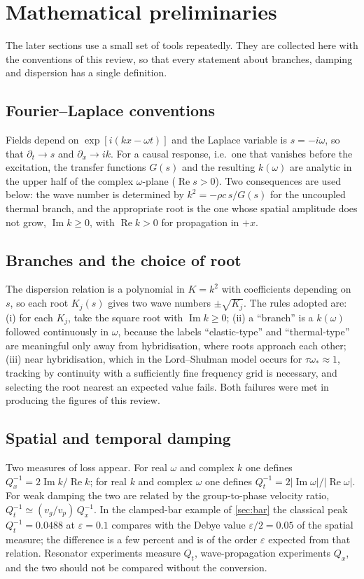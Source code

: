 \section{Mathematical preliminaries}\label{sec:prelim}

The later sections use a small set of tools repeatedly. They are collected here with the conventions of this review, so that every statement about branches, damping and dispersion has a single definition.

\subsection{Fourier--Laplace conventions}
Fields depend on $\exp[i(kx-\omega t)]$ and the Laplace variable is $s=-i\omega$, so that $\partial_t\to s$ and $\partial_x\to ik$. For a causal response, i.e.\ one that vanishes before the excitation, the transfer functions $G(s)$ and the resulting $k(\omega)$ are analytic in the upper half of the complex $\omega$-plane ($\operatorname{Re}s>0$). Two consequences are used below: the wave number is determined by $k^2=-\rho c\,s/G(s)$ for the uncoupled thermal branch, and the appropriate root is the one whose spatial amplitude does not grow, $\operatorname{Im}k\ge0$, with $\operatorname{Re}k>0$ for propagation in $+x$.

\subsection{Branches and the choice of root}
The dispersion relation is a polynomial in $K=k^2$ with coefficients depending on $s$, so each root $K_j(s)$ gives two wave numbers $\pm\sqrt{K_j}$. The rules adopted are: (i) for each $K_j$, take the square root with $\operatorname{Im}k\ge0$; (ii) a ``branch'' is a $k(\omega)$ followed continuously in $\omega$, because the labels ``elastic-type'' and ``thermal-type'' are meaningful only away from hybridisation, where roots approach each other; (iii) near hybridisation, which in the Lord--Shulman model occurs for $\tau\omega_*\approx1$, tracking by continuity with a sufficiently fine frequency grid is necessary, and selecting the root nearest an expected value fails. Both failures were met in producing the figures of this review.

\subsection{Spatial and temporal damping}
Two measures of loss appear. For real $\omega$ and complex $k$ one defines $Q_x^{-1}=2\operatorname{Im}k/\operatorname{Re}k$; for real $k$ and complex $\omega$ one defines $Q_t^{-1}=2|\operatorname{Im}\omega|/|\operatorname{Re}\omega|$. For weak damping the two are related by the group-to-phase velocity ratio, $Q_t^{-1}\simeq(v_g/v_p)\,Q_x^{-1}$. In the clamped-bar example of \cref{sec:bar} the classical peak $Q_t^{-1}=0.0488$ at $\varepsilon=0.1$ compares with the Debye value $\varepsilon/2=0.05$ of the spatial measure; the difference is a few percent and is of the order $\varepsilon$ expected from that relation. Resonator experiments measure $Q_t$, wave-propagation experiments $Q_x$, and the two should not be compared without the conversion.

